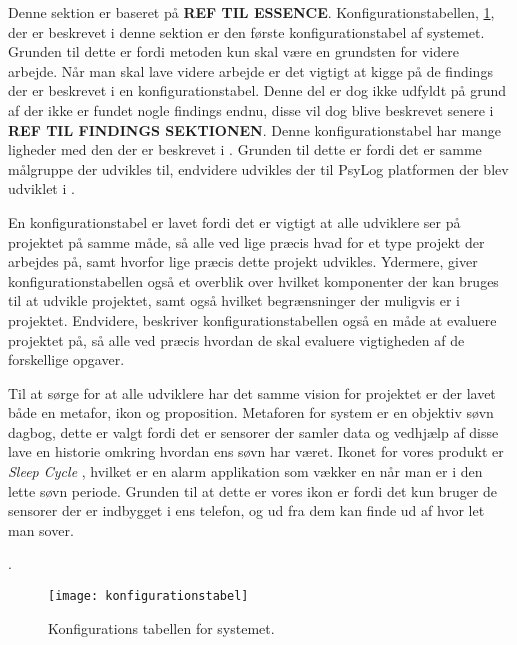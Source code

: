Denne sektion er baseret på \textbf{REF TIL ESSENCE}.
Konfigurationstabellen, \cref{tab:konfigurationsTabel}, der er beskrevet i denne sektion er den første konfigurationstabel af systemet.
Grunden til dette er fordi metoden kun skal være en grundsten for videre arbejde.
Når man skal lave videre arbejde er det vigtigt at kigge på de findings der er beskrevet i en konfigurationstabel.
Denne del er dog ikke udfyldt på grund af der ikke er fundet nogle findings endnu, disse vil dog blive beskrevet senere i \textbf{REF TIL FINDINGS SEKTIONEN}.
Denne konfigurationstabel har mange ligheder med den der er beskrevet i \citet{misc:faellesrapp}.
Grunden til dette er fordi det er samme målgruppe der udvikles til, endvidere udvikles der til PsyLog platformen der blev udviklet i \citet{misc:faellesrapp}.

En konfigurationstabel er lavet fordi det er vigtigt at alle udviklere ser på projektet på samme måde, så alle ved lige præcis hvad for et type projekt der arbejdes på, samt hvorfor lige præcis dette projekt udvikles.
Ydermere, giver konfigurationstabellen også et overblik over hvilket komponenter der kan bruges til at udvikle projektet, samt også hvilket begrænsninger der muligvis er i projektet.
Endvidere, beskriver konfigurationstabellen også en måde at evaluere projektet på, så alle ved præcis hvordan de skal evaluere vigtigheden af de forskellige opgaver.

Til at sørge for at alle udviklere har det samme vision for projektet er der lavet både en metafor, ikon og proposition.
Metaforen for system er en objektiv søvn dagbog, dette er valgt fordi det er sensorer der samler data og vedhjælp af disse lave en historie omkring hvordan ens søvn har været.
Ikonet for vores produkt er \textit{Sleep Cycle} \citep{misc:sleepCycle}, hvilket er en alarm applikation som vækker en når man er i den lette søvn periode.
Grunden til at dette er vores ikon er fordi det kun bruger de sensorer der er indbygget i ens telefon, og ud fra dem kan finde ud af hvor let man sover.

.
\begin{figure}[h]
\texttt{[image: konfigurationstabel]}
\caption{Konfigurations tabellen for systemet.}
\label{tab:konfigurationsTabel}
\end{figure}